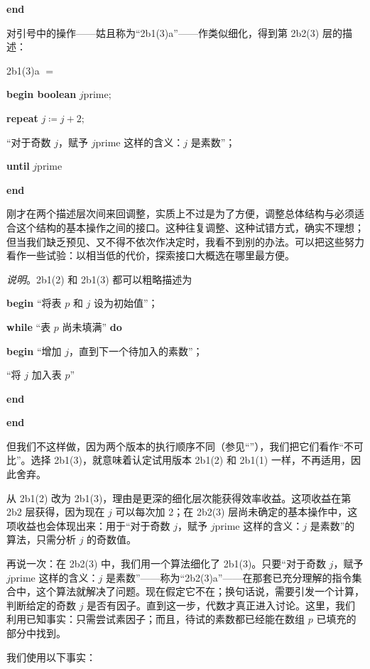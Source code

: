 \documentclass[twoside,11pt,fontset=none]{ctexbook}
\begin{document}
\noindent
\textbf{end}

\noindent
对引号中的操作——姑且称为“2b1(3)a”——作类似细化，得到第 2b2(3) 层的描述：

\noindent
2b1(3)a $=$

\noindent
\textbf{begin boolean} $j$prime;

\noindent
\quad\textbf{repeat} $j \coloneq j + 2;$

\noindent
\quad\quad“对于奇数 $j$，赋予 $j$prime 这样的含义：$j$ 是素数”；

\noindent
\quad\textbf{until} $j$prime

\noindent
\textbf{end}

刚才在两个描述层次间来回调整，实质上不过是为了方便，调整总体结构与必须适合这个结构的基本操作之间的接口。这种往复调整、这种试错方式，确实不理想；但当我们缺乏预见、又不得不依次作决定时，我看不到别的办法。可以把这些努力看作一些试验：以相当低的代价，探索接口大概选在哪里最方便。

\noindent
\textit{说明}。2b1(2) 和 2b1(3) 都可以粗略描述为

\noindent
\textbf{begin} “将表 $p$ 和 $j$ 设为初始值”；

\noindent
\quad\textbf{while} “表 $p$ 尚未填满” \textbf{do}

\noindent
\quad\textbf{begin} “增加 $j$，直到下一个待加入的素数”；

\noindent
\quad\quad “将 $j$ 加入表 $p$”

\noindent
\quad\textbf{end}

\noindent
\textbf{end}

\noindent
但我们不这样做，因为两个版本的执行顺序不同（参见“”），我们把它们看作“不可比”。选择 2b1(3)，就意味着认定试用版本 2b1(2) 和 2b1(1) 一样，不再适用，因此舍弃。

从 2b1(2) 改为 2b1(3)，理由是更深的细化层次能获得效率收益。这项收益在第 2b2 层获得，因为现在 $j$ 可以每次加 2；在 2b2(3) 层尚未确定的基本操作中，这项收益也会体现出来：用于“对于奇数 $j$，赋予 $j$prime 这样的含义：$j$ 是素数”的算法，只需分析 $j$ 的奇数值。

再说一次：在 2b2(3) 中，我们用一个算法细化了 2b1(3)。只要“对于奇数 $j$，赋予 $j$prime 这样的含义：$j$ 是素数”——称为“2b2(3)a”——在那套已充分理解的指令集合中，这个算法就解决了问题。现在假定它不在；换句话说，需要引发一个计算，判断给定的奇数 $j$ 是否有因子。直到这一步，代数才真正进入讨论。这里，我们利用已知事实：只需尝试素因子；而且，待试的素数都已经能在数组 $p$ 已填充的部分中找到。

我们使用以下事实：
\end{document}
